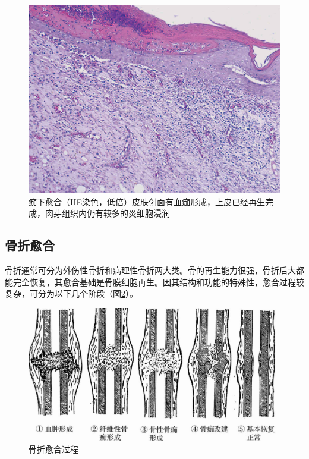 	\begin{figure}[!htbp]
		\centering
		\includegraphics{./images/Image00031.jpg}
		\caption{痂下愈合（HE染色，低倍）{\small 皮肤创面有血痂形成，上皮已经再生完成，肉芽组织内仍有较多的炎细胞浸润}}
		\label{fig2-8} 
		\end{figure} 


\subsection{骨折愈合}

骨折通常可分为外伤性骨折和病理性骨折两大类。骨的再生能力很强，骨折后大都能完全恢复，其愈合基础是骨膜细胞再生。因其结构和功能的特殊性，愈合过程较复杂，可分为以下几个阶段（图\ref{fig2-9}）。

\begin{figure}[!htbp]
	\centering
	\includegraphics{./images/Image00032.jpg}
	\caption{骨折愈合过程}
	\label{fig2-9} 
	\end{figure} 　

